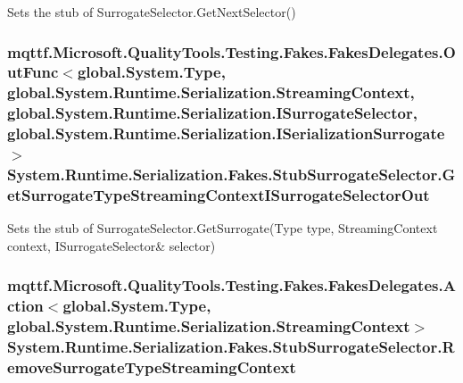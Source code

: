 Sets the stub of Surrogate\-Selector.\-Get\-Next\-Selector()

\hypertarget{class_system_1_1_runtime_1_1_serialization_1_1_fakes_1_1_stub_surrogate_selector_a5e2d4bfa9b098e52921c4b8dc793e602}{
\subsubsection[{Get\-Surrogate\-Type\-Streaming\-Context\-I\-Surrogate\-Selector\-Out}]{\setlength{\rightskip}{0pt plus 5cm}mqttf.\-Microsoft.\-Quality\-Tools.\-Testing.\-Fakes.\-Fakes\-Delegates.\-Out\-Func$<$global.\-System.\-Type, global.\-System.\-Runtime.\-Serialization.\-Streaming\-Context, global.\-System.\-Runtime.\-Serialization.\-I\-Surrogate\-Selector, global.\-System.\-Runtime.\-Serialization.\-I\-Serialization\-Surrogate$>$ System.\-Runtime.\-Serialization.\-Fakes.\-Stub\-Surrogate\-Selector.\-Get\-Surrogate\-Type\-Streaming\-Context\-I\-Surrogate\-Selector\-Out}}\label{class_system_1_1_runtime_1_1_serialization_1_1_fakes_1_1_stub_surrogate_selector_a5e2d4bfa9b098e52921c4b8dc793e602}


Sets the stub of Surrogate\-Selector.\-Get\-Surrogate(Type type, Streaming\-Context context, I\-Surrogate\-Selector\& selector)

\hypertarget{class_system_1_1_runtime_1_1_serialization_1_1_fakes_1_1_stub_surrogate_selector_a1855949aa0eae9609bca41a0e497da83}{
\subsubsection[{Remove\-Surrogate\-Type\-Streaming\-Context}]{\setlength{\rightskip}{0pt plus 5cm}mqttf.\-Microsoft.\-Quality\-Tools.\-Testing.\-Fakes.\-Fakes\-Delegates.\-Action$<$global.\-System.\-Type, global.\-System.\-Runtime.\-Serialization.\-Streaming\-Context$>$ System.\-Runtime.\-Serialization.\-Fakes.\-Stub\-Surrogate\-Selector.\-Remove\-Surrogate\-Type\-Streaming\-Context}}\label{class_system_1_1_runtime_1_1_serialization_1_1_fakes_1_1_stub_surrogate_selector_a1855949aa0eae9609bca41a0e497da83}


